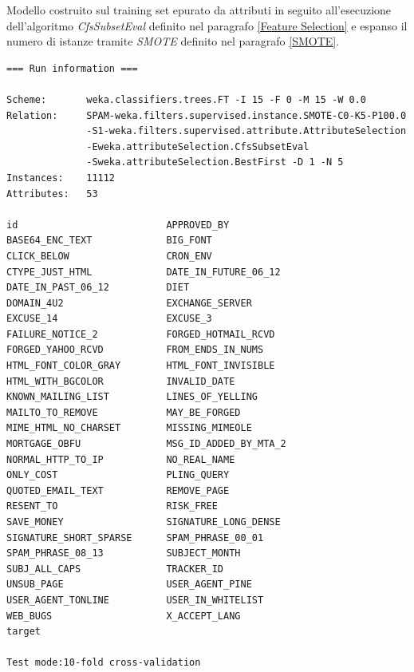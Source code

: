 Modello costruito sul training set epurato da attributi in seguito all'esecuzione dell'algoritmo \emph{CfsSubsetEval} definito nel paragrafo \ref{Feature Selection} e espanso il numero di istanze tramite \emph{SMOTE} definito nel paragrafo \ref{SMOTE}.

\lstset{style=customWeka}
\begin{lstlisting}
=== Run information ===

Scheme:		  weka.classifiers.trees.FT -I 15 -F 0 -M 15 -W 0.0
Relation:     SPAM-weka.filters.supervised.instance.SMOTE-C0-K5-P100.0
			  -S1-weka.filters.supervised.attribute.AttributeSelection
			  -Eweka.attributeSelection.CfsSubsetEval
			  -Sweka.attributeSelection.BestFirst -D 1 -N 5
Instances:    11112
Attributes:   53

id							APPROVED_BY
BASE64_ENC_TEXT				BIG_FONT
CLICK_BELOW					CRON_ENV
CTYPE_JUST_HTML				DATE_IN_FUTURE_06_12
DATE_IN_PAST_06_12			DIET
DOMAIN_4U2					EXCHANGE_SERVER
EXCUSE_14					EXCUSE_3
FAILURE_NOTICE_2			FORGED_HOTMAIL_RCVD
FORGED_YAHOO_RCVD			FROM_ENDS_IN_NUMS
HTML_FONT_COLOR_GRAY		HTML_FONT_INVISIBLE
HTML_WITH_BGCOLOR			INVALID_DATE
KNOWN_MAILING_LIST			LINES_OF_YELLING
MAILTO_TO_REMOVE			MAY_BE_FORGED
MIME_HTML_NO_CHARSET		MISSING_MIMEOLE
MORTGAGE_OBFU				MSG_ID_ADDED_BY_MTA_2
NORMAL_HTTP_TO_IP			NO_REAL_NAME
ONLY_COST					PLING_QUERY
QUOTED_EMAIL_TEXT			REMOVE_PAGE
RESENT_TO					RISK_FREE
SAVE_MONEY					SIGNATURE_LONG_DENSE
SIGNATURE_SHORT_SPARSE		SPAM_PHRASE_00_01
SPAM_PHRASE_08_13			SUBJECT_MONTH
SUBJ_ALL_CAPS				TRACKER_ID
UNSUB_PAGE					USER_AGENT_PINE
USER_AGENT_TONLINE			USER_IN_WHITELIST
WEB_BUGS					X_ACCEPT_LANG
target

Test mode:10-fold cross-validation

\end{lstlisting}


